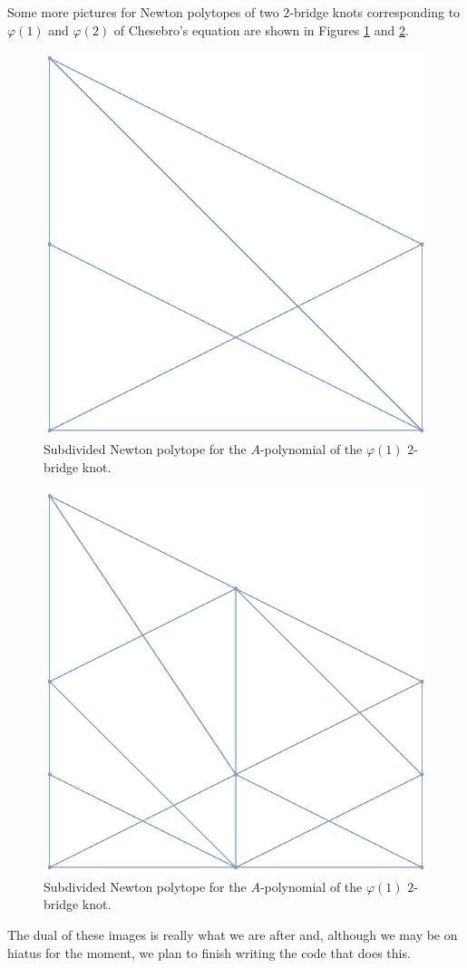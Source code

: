 \documentclass[11pt]{article}
\begin{document}
Some more pictures for Newton polytopes of two $2$-bridge knots
corresponding to $\varphi(1)$ and $\varphi(2)$ of Chesebro's equation are
shown in Figures \ref{fig:phi1} and \ref{fig:phi2}.
\begin{figure}[htpb]
  \centering
  \includegraphics[scale=0.5]{newtonsub_phi1}
  \caption{Subdivided Newton polytope for the $A$-polynomial of the
    $\varphi(1)$ $2$-bridge knot.}
  \label{fig:phi1}
\end{figure}
\begin{figure}[htpb]
  \centering
  \includegraphics[scale=0.5]{newtonsub_phi2}
  \caption{Subdivided Newton polytope for the $A$-polynomial of the
    $\varphi(1)$ $2$-bridge knot.}
  \label{fig:phi2}
\end{figure}

The dual of these images is really what we are after and, although we may
be on hiatus for the moment, we plan to finish writing the code that does
this.

\newpage


\end{document}
